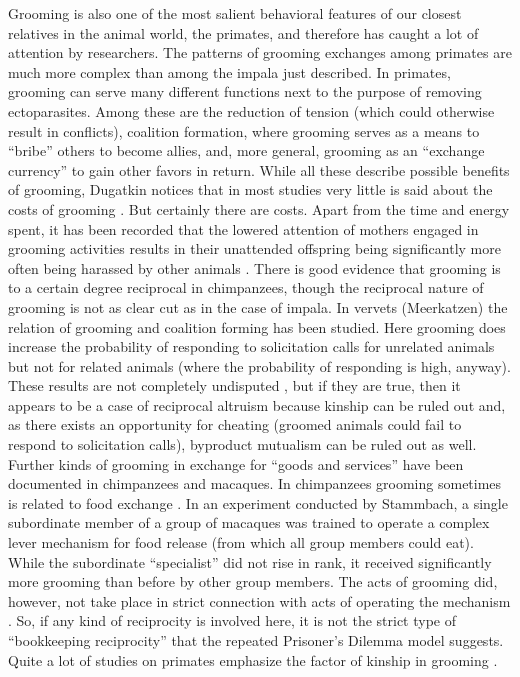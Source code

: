 Grooming is also one of the most salient behavioral features of our closest
relatives in the animal world, the primates, and therefore has caught a lot of
attention by researchers.\label{primateGrooming} The patterns of grooming
exchanges among primates are much more complex than among the impala just
described. In primates, grooming can serve many different functions next to the
purpose of removing ectoparasites. Among these are the reduction of tension
(which could otherwise result in conflicts), coalition formation, where
grooming serves as a means to ``bribe'' others to become allies, and, more
general, grooming as an ``exchange currency'' to gain other favors in return.
While all these describe possible benefits of grooming, Dugatkin notices that
in most studies very little is said about the costs of grooming \cite[p.\ 
117]{dugatkin:1997}. But certainly there are costs. Apart from the time and
energy spent, it has been recorded that the lowered attention of mothers
engaged in grooming activities results in their unattended offspring being
significantly more often being harassed by other animals \cite[p.\ 
117/118]{dugatkin:1997}. There is good evidence that grooming is to a certain
degree reciprocal in chimpanzees, though the reciprocal nature of grooming is
not as clear cut as in the case of impala. In vervets (Meerkatzen) the
relation of grooming and coalition forming has been studied. Here grooming
does increase the probability of responding to solicitation calls for
unrelated animals but not for related animals (where the probability of
responding is high, anyway).  These results are not completely undisputed
\cite[p.\ 120]{dugatkin:1997}, but if they are true, then it appears to be a
case of reciprocal altruism because kinship can be ruled out and, as there
exists an opportunity for cheating (groomed animals could fail to respond to
solicitation calls), byproduct mutualism can be ruled out as well. Further
kinds of grooming in exchange for ``goods and services'' have been documented
in chimpanzees and macaques. In chimpanzees grooming sometimes is related to
food exchange \cite[p.\  123]{dugatkin:1997}. In an experiment conducted by
Stammbach, a single subordinate member of a group of macaques was trained to
operate a complex lever mechanism for food release (from which all group
members could eat).  While the subordinate ``specialist'' did not rise in
rank, it received significantly more grooming than before by other group
members. The acts of grooming did, however, not take place in strict
connection with acts of operating the mechanism \cite[p.\ 124]{dugatkin:1997}.
So, if any kind of reciprocity is involved here, it is not the strict type of
``bookkeeping reciprocity'' that the repeated Prisoner's Dilemma model
suggests. Quite a lot of studies on primates emphasize the factor of kinship
in grooming \cite[p.\ 124]{dugatkin:1997}.

